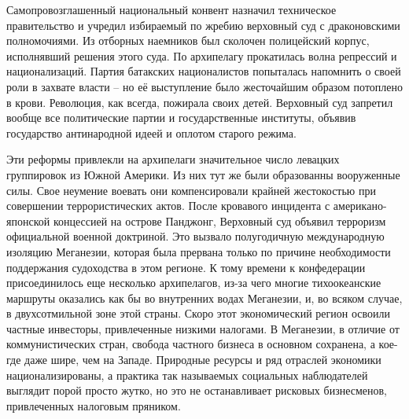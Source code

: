 \documentclass{book}
\begin{document}
Самопровозглашенный национальный конвент назначил техническое правительство и учредил избираемый по жребию верховный суд с драконовскими полномочиями. Из отборных наемников был сколочен полицейский корпус, исполнявший решения этого суда. По архипелагу прокатилась волна репрессий и национализаций. Партия батакских националистов попыталась напомнить о своей роли в захвате власти -- но её выступление было жесточайшим образом потоплено в крови. Революция, как всегда, пожирала своих детей. Верховный суд запретил вообще все политические партии и государственные институты, объявив государство антинародной идеей и оплотом старого режима.

Эти реформы привлекли на архипелаги значительное число левацких группировок из Южной Америки. Из них тут же были образованны вооруженные силы. Свое неумение воевать они компенсировали крайней жестокостью при совершении террористических актов. После кровавого инцидента с американо-японской концессией на острове Панджонг, Верховный суд объявил терроризм официальной военной доктриной. Это вызвало полугодичную международную изоляцию Меганезии, которая была прервана только по причине необходимости поддержания судоходства в этом регионе. К тому времени к конфедерации присоединилось еще несколько архипелагов, из-за чего многие тихоокеанские маршруты оказались как бы во внутренних водах Меганезии, и, во всяком случае, в двухсотмильной зоне этой страны. Скоро этот экономический регион освоили частные инвесторы, привлеченные низкими налогами. В Меганезии, в отличие от коммунистических стран, свобода частного бизнеса в основном сохранена, а кое-где даже шире, чем на Западе. Природные ресурсы и ряд отраслей экономики национализированы, а практика так называемых социальных наблюдателей выглядит порой просто жутко, но это не останавливает рисковых бизнесменов, привлеченных налоговым пряником.
\end{document}
